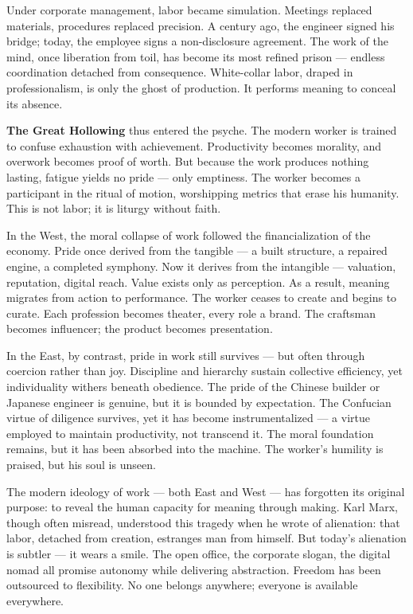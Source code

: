 \documentclass[11pt,twoside]{book}
\begin{document}
Under corporate management, labor became simulation.  
Meetings replaced materials, procedures replaced precision.  
A century ago, the engineer signed his bridge; today, the employee signs a non-disclosure agreement.  
The work of the mind, once liberation from toil, has become its most refined prison — endless coordination detached from consequence.  
White-collar labor, draped in professionalism, is only the ghost of production.  
It performs meaning to conceal its absence.

\textbf{The Great Hollowing} thus entered the psyche.  
The modern worker is trained to confuse exhaustion with achievement.  
Productivity becomes morality, and overwork becomes proof of worth.  
But because the work produces nothing lasting, fatigue yields no pride — only emptiness.  
The worker becomes a participant in the ritual of motion, worshipping metrics that erase his humanity.  
This is not labor; it is liturgy without faith.

In the West, the moral collapse of work followed the financialization of the economy.  
Pride once derived from the tangible — a built structure, a repaired engine, a completed symphony.  
Now it derives from the intangible — valuation, reputation, digital reach.  
Value exists only as perception.  
As a result, meaning migrates from action to performance.  
The worker ceases to create and begins to curate.  
Each profession becomes theater, every role a brand.  
The craftsman becomes influencer; the product becomes presentation.

In the East, by contrast, pride in work still survives — but often through coercion rather than joy.  
Discipline and hierarchy sustain collective efficiency, yet individuality withers beneath obedience.  
The pride of the Chinese builder or Japanese engineer is genuine, but it is bounded by expectation.  
The Confucian virtue of diligence survives, yet it has become instrumentalized — a virtue employed to maintain productivity, not transcend it.  
The moral foundation remains, but it has been absorbed into the machine.  
The worker’s humility is praised, but his soul is unseen.

The modern ideology of work — both East and West — has forgotten its original purpose: to reveal the human capacity for meaning through making.  
Karl Marx, though often misread, understood this tragedy when he wrote of alienation: that labor, detached from creation, estranges man from himself.  
But today’s alienation is subtler — it wears a smile.  
The open office, the corporate slogan, the digital nomad all promise autonomy while delivering abstraction.  
Freedom has been outsourced to flexibility.  
No one belongs anywhere; everyone is available everywhere.
\end{document}
